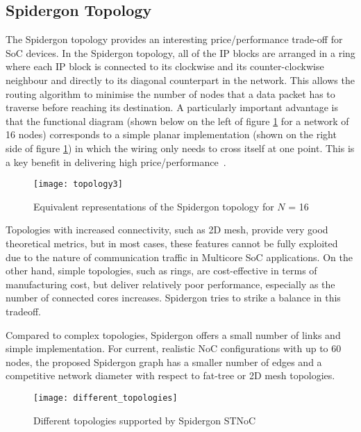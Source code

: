 \subsection{Spidergon Topology}\label{S:topology}

The Spidergon topology provides an interesting price/performance trade-off for SoC devices. 
In the Spidergon topology, all of the IP blocks are arranged in a ring where each IP block is connected to its clockwise and its counter-clockwise neighbour and directly to its diagonal counterpart in the network. 
This allows the routing algorithm to minimise the number of nodes that a data packet has to traverse before reaching its destination. 
A particularly important advantage is that the functional diagram (shown below on the left of figure \ref{fig:topology} for a network of 16 nodes) corresponds to a simple planar implementation (shown on the right side of figure \ref{fig:topology}) in which the wiring only needs to cross itself at one point. This is a key benefit in delivering high price/performance~\cite{STMicroelectronics2005}.

	\begin{figure}[ht]
	\centering
		\texttt{[image: topology3]}
		\caption{Equivalent representations of the Spidergon topology for ${N}$ = 16}
		\label{fig:topology}
	\end{figure}

Topologies with increased connectivity, such as 2D mesh, provide very good theoretical metrics, but in most cases, these features cannot be fully exploited due to the nature of communication traffic in Multicore SoC applications. 
On the other hand, simple topologies, such as rings, are cost-effective in terms of manufacturing cost, but deliver relatively poor performance, especially as the number of connected cores increases. Spidergon tries to strike a balance in this tradeoff. 

Compared to complex topologies, Spidergon offers a small number of links and simple implementation. For current, realistic NoC configurations with up to 60 nodes, the proposed Spidergon graph has a smaller number of edges and a competitive network diameter with respect to fat-tree or 2D mesh topologies.

	\begin{figure}[ht]
	\centering
		\texttt{[image: different\_topologies]}
		\caption{Different topologies supported by Spidergon STNoC}
		\label{fig:different_topologies}
	\end{figure}

